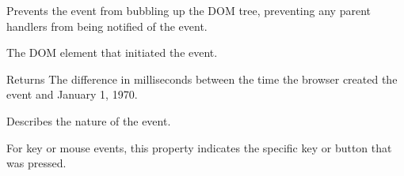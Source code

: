 Prevents the event from bubbling up the D\-O\-M tree, preventing any parent handlers from being notified of the event.

The D\-O\-M element that initiated the event.

\begin{DoxyReturn}{Returns}
The difference in milliseconds between the time the browser created the event and January 1, 1970.

Describes the nature of the event.

For key or mouse events, this property indicates the specific key or button that was pressed.


\end{DoxyReturn}
\hypertarget{jquery-1_810_82_8intellisense_8js_abcf3dc0ac27677031e769f329e49d75a}{
}

